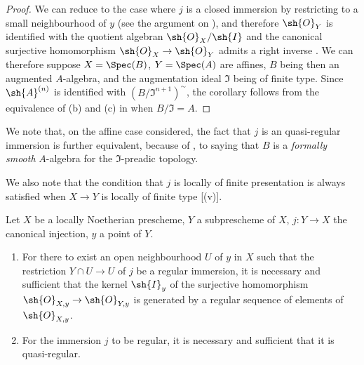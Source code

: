 \begin{proof}
We can reduce to the case where $j$ is a closed immersion by restricting to a small neighbourhood of $y$ (see the argument on ), and therefore $\sh{O}_Y$ is identified with the quotient algebran $\sh{O}_X/\sh{I}$ and the canonical surjective homomorphism $\sh{O}_X \to \sh{O}_Y$ admits a
right inverse .
We can therefore suppose $X = \Spec(B)$, $Y = \Spec(A)$ are affines, $B$ being then an augmented $A$-algebra, and the augmentation ideal $\mathfrak{I}$ being of finite type.
Since $\sh{A}^{(n)}$ is identified with $(B/\mathfrak{I}^{n+1})^{\sim}$, the  corollary follows from the equivalence of (b) and (c) in  when $B/\mathfrak{I} = A$.
\end{proof}

We note that, on the affine case considered, the fact that $j$ is an quasi-regular immersion is further equivalent, because of , to saying that $B$ is a \emph{formally smooth} $A$-algebra for the $\mathfrak{I}$-preadic topology.

We also note that the condition that $j$ is locally of finite presentation is always satisfied when $X \to Y$ is locally of finite type [(v)].

\begin{proposition}[16.9.10]
\label{IV.16.9.10}
Let $X$ be a locally Noetherian prescheme, $Y$ a subprescheme of $X$, $j:Y \to X$ the canonical injection, $y$ a point of $Y$.
\begin{enumerate}
  \item[\rm{(i)}] For there to exist an open neighbourhood $U$ of $y$ in $X$ such that the restriction $Y \cap U \to U$ of $j$ be a regular immersion, it is necessary and sufficient that the kernel $\sh{I}_y$ of the surjective homomorphism $\sh{O}_{X,y} \to \sh{O}_{Y,y}$ is generated by a regular sequence of elements of $\sh{O}_{X,y}$.

  \item[\rm{(ii)}] For the immersion $j$ to be regular, it is necessary and sufficient that it is quasi-regular.
\end{enumerate}
\end{proposition}

